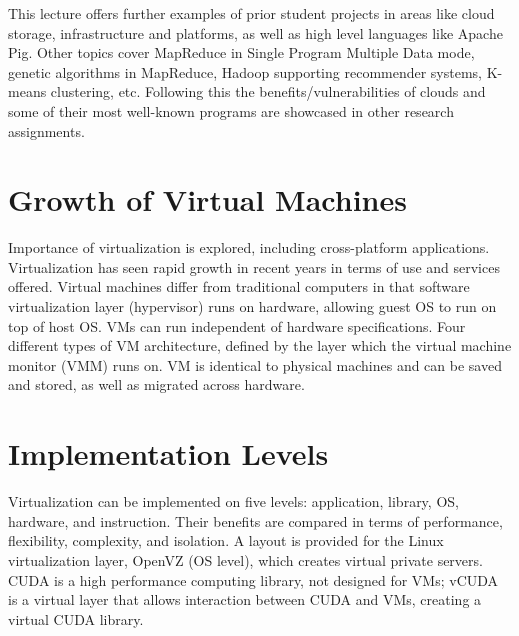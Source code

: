 This lecture offers further examples of prior student projects in areas
like cloud storage, infrastructure and platforms, as well as high level
languages like Apache Pig. Other topics cover MapReduce in Single
Program Multiple Data mode, genetic algorithms in MapReduce, Hadoop
supporting recommender systems, K-means clustering, etc. Following this
the benefits/vulnerabilities of clouds and some of their most well-known
programs are showcased in other research assignments.



\section{Growth of Virtual Machines}

Importance of virtualization is explored, including cross-platform
applications. Virtualization has seen rapid growth in recent years in
terms of use and services offered. Virtual machines differ from
traditional computers in that software virtualization layer (hypervisor)
runs on hardware, allowing guest OS to run on top of host OS. VMs can
run independent of hardware specifications. Four different types of VM
architecture, defined by the layer which the virtual machine monitor
(VMM) runs on. VM is identical to physical machines and can be saved and
stored, as well as migrated across hardware.



\section{Implementation Levels}

Virtualization can be implemented on five levels: application, library,
OS, hardware, and instruction. Their benefits are compared in terms of
performance, flexibility, complexity, and isolation. A layout is
provided for the Linux virtualization layer, OpenVZ (OS level), which
creates virtual private servers. CUDA is a high performance computing
library, not designed for VMs; vCUDA is a virtual layer that allows
interaction between CUDA and VMs, creating a virtual CUDA library.

